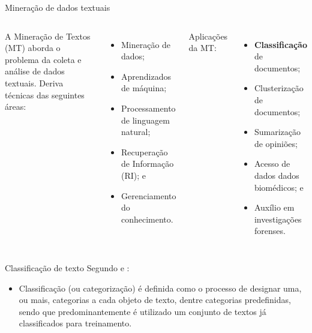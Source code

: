 \documentclass[%
  10pt,%
  aspectratio = 169,%
  compress,%
  t,%
]{beamer}%
\begin{document}
    \begin{frame}{}{Mineração de dados textuais}
        \begin{columns}[t]
            A Mineração de Textos (MT) aborda o problema da coleta e análise de dados textuais. Deriva técnicas das seguintes áreas:
            
            \begin{itemize}
                \item Mineração de dados;
                \item Aprendizados de máquina;
                \item Processamento de linguagem natural;
                \item Recuperação de Informação (RI); e 
                \item Gerenciamento do conhecimento.
            \end{itemize}
            Aplicações da MT:
            \begin{itemize}
                \item \textbf{Classificação} de documentos;
                \item Clusterização de documentos;
                \item Sumarização de opiniões;
                \item Acesso de dados dados biomédicos; e
                \item Auxílio em investigações forenses.
            \end{itemize}
        \end{columns}

        
        \begin{block}{Classificação de texto}
            Segundo \cite[p.~7]{Jo2018TMCIBDC} e \cite[p.~299]{Zhai2016TDMA}:
            \begin{itemize}
                \item Classificação (ou categorização) é definida como o processo de designar uma, ou mais, categorias a cada objeto de texto, dentre categorias predefinidas, sendo que predominantemente é utilizado um conjunto de textos já classificados para treinamento.
            \end{itemize}
        \end{block}
    \end{frame}
    
\end{document}
